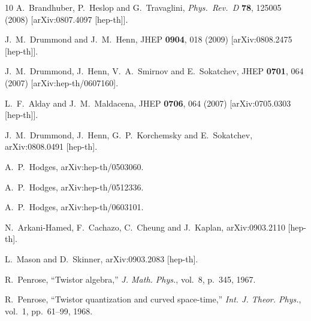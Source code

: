 \documentclass[12pt]{article}
\begin{document}
\begin{thebibliography}{10}
  A.~Brandhuber, P.~Heslop and G.~Travaglini,
  {\em Phys.\ Rev.\  D} {\bf 78}, 125005 (2008)
  [arXiv:0807.4097 [hep-th]].


 J.~M.~Drummond and J.~M.~Henn,
  JHEP {\bf 0904}, 018 (2009)
  [arXiv:0808.2475 [hep-th]].
  
  J.~M.~Drummond, J.~Henn, V.~A.~Smirnov and E.~Sokatchev,
  JHEP {\bf 0701}, 064 (2007)
  [arXiv:hep-th/0607160].

 L.~F.~Alday and J.~M.~Maldacena,
  JHEP {\bf 0706}, 064 (2007)
  [arXiv:0705.0303 [hep-th]].
  
  J.~M.~Drummond, J.~Henn, G.~P.~Korchemsky and E.~Sokatchev,
  arXiv:0808.0491 [hep-th].

 A.~P.~Hodges,
  arXiv:hep-th/0503060.

 A.~P.~Hodges,
  arXiv:hep-th/0512336.

 A.~P.~Hodges,
  arXiv:hep-th/0603101.

 N.~Arkani-Hamed, F.~Cachazo, C.~Cheung and J.~Kaplan,
  arXiv:0903.2110 [hep-th].

 L.~Mason and D.~Skinner,
  arXiv:0903.2083 [hep-th].

R.~Penrose, ``{Twistor algebra},'' {\em J. Math. Phys.}, vol.~8, p.~345, 1967.

R.~Penrose, ``{Twistor quantization and curved space-time},'' {\em Int. J.
  Theor. Phys.}, vol.~1, pp.~61--99, 1968.


\end{thebibliography}
\end{document}
